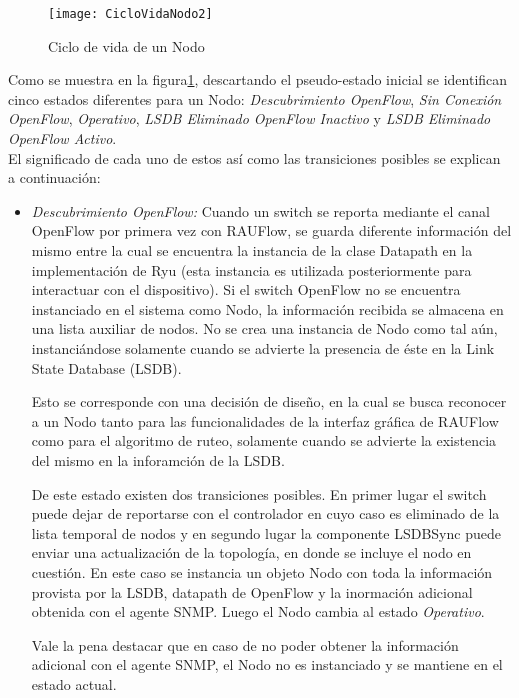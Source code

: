 \begin{figure}[ht!] 
\centering    
\texttt{[image: CicloVidaNodo2]}
\caption[Ciclo de vida de un Nodo]{Ciclo de vida de un Nodo}
\label{fig:CicloVidaNodo}
\end{figure}
  
Como se muestra en la figura\ref{fig:CicloVidaNodo}, descartando el pseudo-estado inicial se identifican cinco estados diferentes para un Nodo: \textit{Descubrimiento OpenFlow}, \textit{Sin Conexión OpenFlow}, \textit{Operativo}, \textit{LSDB Eliminado OpenFlow Inactivo} y \textit{LSDB Eliminado OpenFlow Activo}.\\

El significado de cada uno de estos as\'i como las transiciones posibles se explican a continuación:

\begin{itemize}
\item \textit{Descubrimiento OpenFlow:} Cuando un switch se reporta mediante el canal OpenFlow por primera vez con RAUFlow, se guarda diferente informaci\'on del mismo entre la cual se encuentra la instancia de la clase Datapath en la implementaci\'on de Ryu (esta instancia es utilizada posteriormente para interactuar con el dispositivo). Si el switch OpenFlow no se encuentra instanciado en el sistema como Nodo, la informaci\'on recibida se almacena en una lista auxiliar de nodos. No se crea una instancia de Nodo como tal a\'un, instanci\'andose solamente cuando se advierte la presencia de \'este en la Link State Database (LSDB). 

Esto se corresponde con una decisión de diseño, en la cual se busca reconocer a un Nodo tanto para las funcionalidades de la interfaz gr\'afica de RAUFlow como para el algoritmo de ruteo, solamente cuando se advierte la existencia del mismo en la inforamci\'on de la LSDB. 

De este estado existen dos transiciones posibles. En primer lugar el switch puede dejar de reportarse con el controlador en cuyo caso es eliminado de la lista temporal de nodos y en segundo lugar la componente LSDBSync puede enviar una actualizaci\'on de la topolog\'ia, en donde se incluye el nodo en cuestión. En este caso se instancia un objeto Nodo con toda la informaci\'on provista por la LSDB, datapath de OpenFlow y la inormaci\'on adicional obtenida con el agente SNMP. Luego el Nodo cambia al estado \textit{Operativo}.

Vale la pena destacar que en caso de no poder obtener la informaci\'on adicional con el agente SNMP, el Nodo no es instanciado y se mantiene en el estado actual.


\end{itemize}
